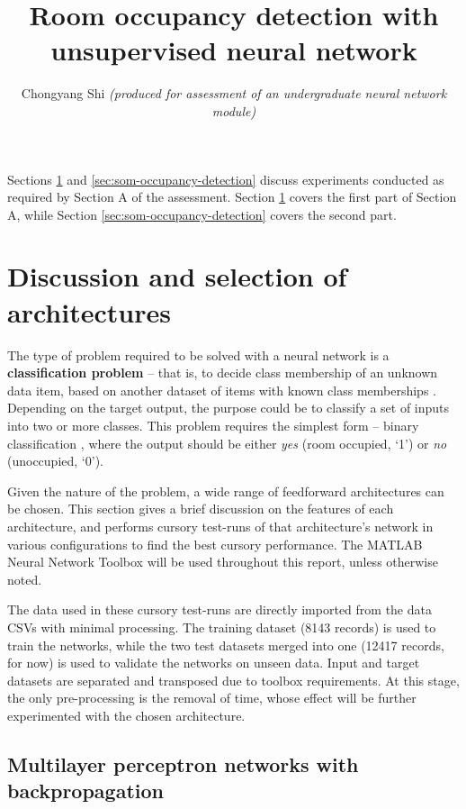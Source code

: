 \documentclass[10pt, oneside]{article}
\title{\vspace{-1.6cm}Room occupancy detection with unsupervised neural network}
\author{Chongyang Shi \emph{(produced for assessment of an undergraduate neural network module)}}
\date{}
\begin{document}
\maketitle

Sections \ref{sec:architectures} and \ref{sec:som-occupancy-detection} discuss experiments conducted as required by Section A of the assessment. Section \ref{sec:architectures} covers the first part of Section A, while Section \ref{sec:som-occupancy-detection} covers the second part.

\section{Discussion and selection of architectures} \label{sec:architectures}
The type of problem required to be solved with a neural network is a \textbf{classification problem} -- that is, to decide class membership of an unknown data item, based on another dataset of items with known class memberships \cite[Sec. 2]{Dreiseitl2002352}. Depending on the target output, the purpose could be to classify a set of inputs into two or more classes. This problem requires the simplest form -- binary classification \cite[Fig. 4]{candanedo2016accurate}, where the output should be either \textit{yes} (room occupied, `1') or \textit{no} (unoccupied, `0'). 

Given the nature of the problem, a wide range of feedforward architectures can be chosen. This section gives a brief discussion on the features of each architecture, and performs cursory test-runs of that architecture's network in various configurations to find the best cursory performance. The MATLAB Neural Network Toolbox \cite{kohonen2014matlab} will be used throughout this report, unless otherwise noted.

The data used in these cursory test-runs are directly imported from the data CSVs with minimal processing. The training dataset (8143 records) is used to train the networks, while the two test datasets merged into one (12417 records, for now) is used to validate the networks on unseen data. Input and target datasets are separated and transposed due to toolbox requirements. At this stage, the only pre-processing is the removal of time, whose effect will be further experimented with the chosen architecture.

\subsection{Multilayer perceptron networks with backpropagation} \label{subsec:mlp-test}
\end{document}
